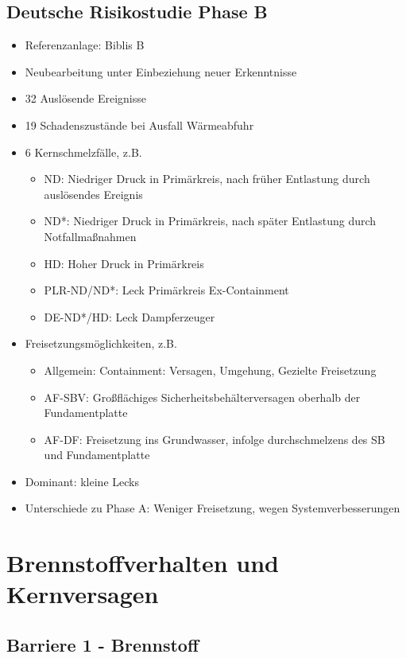 \documentclass[12pt]{article}
\begin{document}
\subsection{Deutsche Risikostudie Phase B}
\begin{itemize}[noitemsep]
	\item Referenzanlage: Biblis B
	\item Neubearbeitung unter Einbeziehung neuer Erkenntnisse
	\item 32 Auslösende Ereignisse
	\item 19 Schadenszustände bei Ausfall Wärmeabfuhr
	\item 6 Kernschmelzfälle, z.B.
		\begin{itemize}[noitemsep]
			\item ND: Niedriger Druck in Primärkreis, nach früher Entlastung durch auslösendes Ereignis
			\item ND*: Niedriger Druck in Primärkreis, nach später Entlastung durch Notfallmaßnahmen
			\item HD: Hoher Druck in Primärkreis
			\item PLR-ND/ND*: Leck Primärkreis Ex-Containment
			\item DE-ND*/HD: Leck Dampferzeuger
		\end{itemize}
	\item Freisetzungsmöglichkeiten, z.B.
		\begin{itemize}[noitemsep]
			\item Allgemein: Containment: Versagen, Umgehung, Gezielte Freisetzung
			\item AF-SBV: Großflächiges Sicherheitsbehälterversagen oberhalb der Fundamentplatte
			\item AF-DF: Freisetzung ins Grundwasser, infolge durchschmelzens des SB und Fundamentplatte
		\end{itemize}
	\item Dominant: kleine Lecks
	\item Unterschiede zu Phase A: Weniger Freisetzung, wegen Systemverbesserungen
\end{itemize}

\section{Brennstoffverhalten und Kernversagen}

\subsection{Barriere 1 - Brennstoff}
\end{document}
